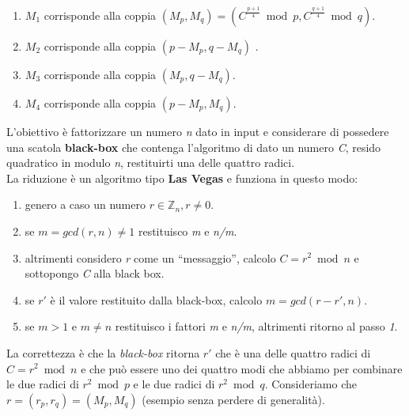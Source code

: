 \begin{enumerate}
    \item $M_1$ corrisponde alla coppia $(M_p, M_q) = (C^{\frac{p + 1}{4}} \bmod p, C^{\frac{q + 1}{4}} \bmod q)$.
    \item $M_2$ corrisponde alla coppia $(p - M_p, q - M_q)$ .
    \item $M_3$ corrisponde alla coppia $(M_p, q - M_q)$.
    \item $M_4$ corrisponde alla coppia $(p - M_p, M_q)$.
\end{enumerate}
L'obiettivo è fattorizzare un numero \textit{n} dato in input e considerare di possedere una scatola \textbf{black-box} che contenga l'algoritmo di dato un numero \textit{C}, resido quadratico in modulo \textit{n}, restituirti una delle quattro radici. \\
La riduzione è un algoritmo tipo \textbf{Las Vegas} e funziona in questo modo:
\begin{enumerate}
    \item genero a caso un numero $r \in \mathbb{Z}_n, r \neq 0$.
    \item se $m = gcd(r, n) \neq 1$ restituisco \textit{m} e \textit{n/m}.
    \item altrimenti considero \textit{r} come un ``messaggio'', calcolo $C = r^2 \bmod n$ e sottopongo \textit{C} alla black box.
    \item se $r'$ è il valore restituito dalla black-box, calcolo $m = gcd(r - r', n)$.
    \item se $m > 1 \text{ e } m \neq n$ restituisco i fattori \textit{m} e \textit{n/m}, altrimenti ritorno al passo \textit{1}.
\end{enumerate}
La correttezza è che la \textit{black-box} ritorna $r'$ che è una delle quattro radici di $C = r^2 \bmod n$ e che può essere uno dei quattro modi che abbiamo per combinare le due radici di $r^2 \bmod p$ e le due radici di $r^2 \bmod q$. Consideriamo che $r = (r_p, r_q) = (M_p, M_q)$ (esempio senza perdere di generalità).
